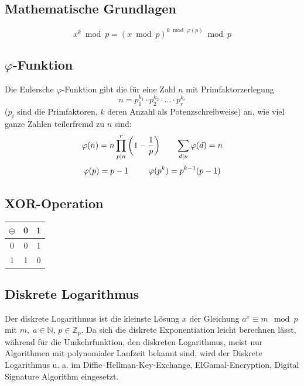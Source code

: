\documentclass[8pt,a4paper,landscape]{article}
\begin{document}
\begin{multicols}{4}
\section{Mathematische Grundlagen}

\[ x^k \bmod p = \left( x \bmod p \right)^{k \bmod \varphi(p)} \bmod p \]

\subsection{$\varphi$-Funktion}
Die Eulersche $\varphi$-Funktion gibt die für eine Zahl $n$ mit Primfaktorzerlegung 
\[n = p_{1}^{k_1} \cdot p_{2}^{k_2} \cdot \ldots \cdot p_{r}^{k_r}\]
($p_{i}$ sind die Primfaktoren, $k$ deren Anzahl als Potenzschreibweise) an, wie viel ganze Zahlen teilerfremd zu \(n\) sind:
\[\varphi(n) = n\prod_{p|n}^{r}\left (1 - \frac{1}{p}\right)\thickspace\thickspace\thickspace\thickspace\thickspace\thickspace\thickspace\sum_{d \vert n} \varphi(d) = n  \]
\[\varphi(p) = p - 1\thickspace\thickspace\thickspace\thickspace\thickspace\thickspace\thickspace\thickspace\thickspace\varphi(p^k) = p^{k-1}(p-1) \]

\subsection{XOR-Operation}
\begin{center}
\begin{tabular}{c| c c }
$\oplus$ & 0 & 1 \\ \hline
0 & 0 & 1\\ 
1 & 1 & 0 
\end{tabular}
\end{center}

\subsection{Diskrete Logarithmus}
Der diskrete Logarithmus ist die kleinste Lösung $x$ der Gleichung $a^x \equiv m \mod p$ mit $m, \;a \in \mathbb{N}$, $p \in \mathbb{Z}_p$. Da sich die diskrete Exponentiation leicht berechnen lässt, während für die Umkehrfunktion, den diskreten Logarithmus, meist nur Algorithmen mit polynomialer Laufzeit bekannt sind, wird der Diskrete Logarithmus u. a. im Diffie–Hellman-Key-Exchange, ElGamal-Encryption, Digital Signature Algorithm eingesetzt.


\end{multicols}
\end{document}
